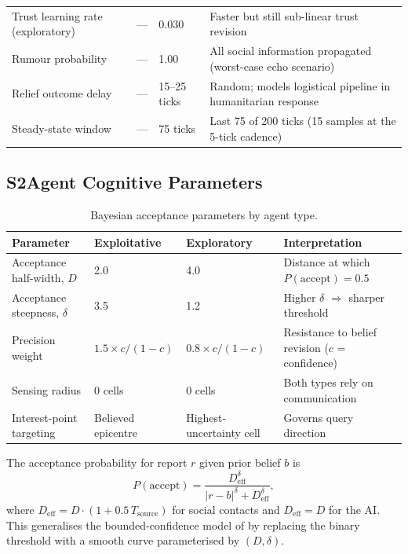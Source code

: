 \documentclass[pdflatex,sn-apa]{sn-jnl}%
\begin{document}
\begin{appendices}
\begin{table}[h]
\begin{tabular}{llll}
Trust learning rate (exploratory)  & --- & 0.030   & Faster but still sub-linear trust revision \\
Rumour probability          & ---  & 1.00           & All social information propagated (worst-case echo scenario) \\
Relief outcome delay        & ---  & 15--25 ticks   & Random; models logistical pipeline in humanitarian response \\
Steady-state window         & ---  & 75 ticks       & Last 75 of 200 ticks (15 samples at the 5-tick cadence) \\
\bottomrule
\end{tabular}
\end{table}

\subsection*{S2\quad Agent Cognitive Parameters}

\begin{table}[h]
\centering
\caption{Bayesian acceptance parameters by agent type.}
\label{tab:S2}
\small
\begin{tabular}{llll}
\toprule
Parameter & Exploitative & Exploratory & Interpretation \\
\midrule
Acceptance half-width, $D$   & 2.0 & 4.0 & Distance at which $P(\text{accept})=0.5$ \\
Acceptance steepness, $\delta$ & 3.5 & 1.2 & Higher $\delta$ $\Rightarrow$ sharper threshold \\
Precision weight             & $1.5\times c/(1-c)$ & $0.8\times c/(1-c)$ & Resistance to belief revision ($c$ = confidence) \\
Sensing radius               & 0 cells & 0 cells & Both types rely on communication \\
Interest-point targeting     & Believed epicentre & Highest-uncertainty cell & Governs query direction \\
\bottomrule
\end{tabular}
\end{table}

The acceptance probability for report $r$ given prior belief $b$ is
%
\begin{equation}
  P(\text{accept}) = \frac{D_{\mathrm{eff}}^{\delta}}{|r-b|^{\delta}+D_{\mathrm{eff}}^{\delta}},
  \tag{S1}
\end{equation}
%
where $D_{\mathrm{eff}} = D\cdot(1+0.5\,T_{\mathrm{source}})$ for social
contacts and $D_{\mathrm{eff}}=D$ for the AI.
This generalises the bounded-confidence model of \citet{Deffuant2000} by
replacing the binary threshold with a smooth curve parameterised by $(D,\delta)$.


\end{appendices}
\end{document}
